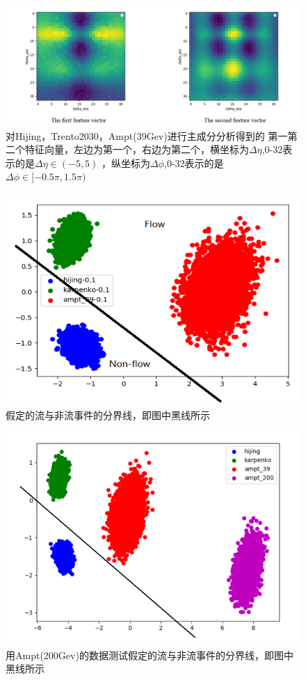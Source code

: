 \documentclass[aps,pre,12pt,preprint,onecolumn,showpacs,showkeys]{revtex4-1}
\begin{document}
\begin{figure}[t]
\centering
\includegraphics[width=140mm]{tzxl}
\caption{\label{fig:tzxl}%
对Hijing，Trento2030，Ampt(39Gev)进行主成分分析得到的
第一第二个特征向量，左边为第一个，右边为第二个，横坐标为$\Delta\eta$,0-32表示的是$\Delta\eta\in(-5,5)$
，纵坐标为$\Delta\phi$,0-32表示的是$\Delta\phi\in[-0.5\pi,1.5\pi)$}
\end{figure}
\begin{figure}[t]
\centering
\includegraphics[width=140mm]{qb}
\caption{\label{fig:qb}%
假定的流与非流事件的分界线，即图中黑线所示}
\end{figure}
\begin{figure}[t]
\centering
\includegraphics[width=140mm]{cs}
\caption{\label{fig:cs}%
用Ampt(200Gev)的数据测试假定的流与非流事件的分界线，即图中黑线所示}
\end{figure}
\end{document}
